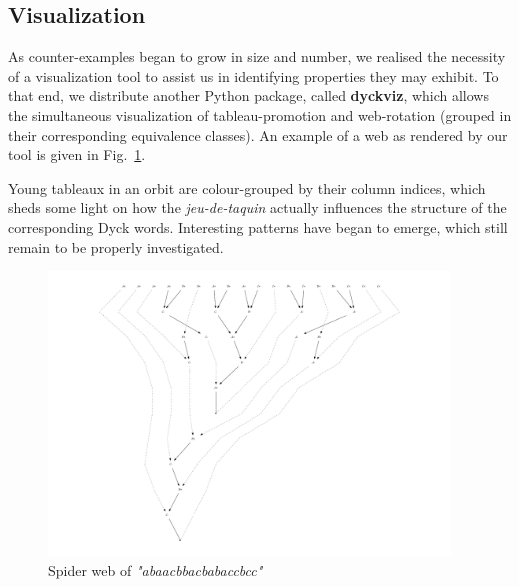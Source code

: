 \documentclass{llncs}
\newcommand{\w}[1]{\textit{"#1"}}
\begin{document}
\subsection{Visualization}
As counter-examples began to grow in size and number, we realised the necessity of a visualization tool to assist us in identifying properties they may exhibit. To that end, we distribute another Python package, called \textbf{dyckviz}, which allows the simultaneous visualization of tableau-promotion and web-rotation (grouped in their corresponding equivalence classes). An example of a web as rendered by our tool is given in Fig.~\ref{fig:web}.

Young tableaux in an orbit are colour-grouped by their column indices, which sheds some light on how the \textit{jeu-de-taquin} actually influences the structure of the corresponding Dyck words. Interesting patterns have began to emerge, which still remain to be properly investigated. 

\begin{figure}
\begin{center}
\includegraphics[width=0.95\textwidth]{web.pdf}
\caption{Spider web of \w{abaacbbacbabaccbcc}}
\label{fig:web}
\end{center}
\end{figure}
\end{document}
